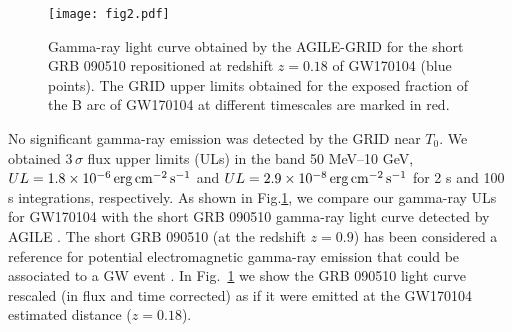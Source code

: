\documentclass[preprint2]{aastex}
\def\gw {GW170104 }
\def \fv {}
\def \mt {}
\begin{document}
\begin{figure}[t]
    \centerline{\texttt{[image: fig2.pdf]}}
    \caption{Gamma-ray light curve obtained by the AGILE-GRID for the short GRB 090510 repositioned at
redshift $z = 0.18$ of \gw  (blue points).
    The GRID upper limits obtained for the exposed fraction of
the B arc of \gw at different timescales are marked in red. }
 \label{fig-3}
 \end{figure}

No significant gamma-ray emission was detected by the GRID near $T_0$.
 We obtained $3\,\sigma$ flux upper limits (ULs) in the band 50 MeV--10
GeV, $UL = 1.8 \times 10^{-6} \rm \, erg \, cm^{-2} \, s^{-1}$ and
$UL = 2.9 \times 10^{-8} \rm \, erg \, cm^{-2} \, s^{-1}$ for 2
s and 100 s integrations, {\mt respectively}.
As shown in Fig.\ref{fig-3}, we compare our gamma-ray ULs
 for \gw with the short GRB 090510 gamma-ray light curve detected by AGILE
\cite[][]{2010ApJ...708L..84G}. The short GRB 090510 (at the redshift $ z = 0.9$)
has been considered a reference for {\fv potential} electromagnetic gamma-ray emission
that could be associated to a GW event
\cite[][]{2016ApJ...823L...2A,2016ApJ...825L...4T}.
In Fig.~\ref{fig-3} we show the GRB 090510 light curve
rescaled (in flux and time corrected) as if it were emitted at the
\gw estimated distance ($z=0.18$).
\end{document}
